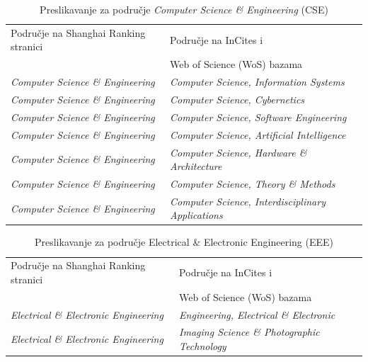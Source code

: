 \documentclass[times, utf8, zavrsni]{fer}
\begin{document}
\begin{table}[htb]
    \caption{Preslikavanje za područje \emph{Computer Science \& Engineering} (CSE)}
    \label{tbl:konstante}
    \centering
    \begin{tabular}{ll} \hline
    Područje na Shanghai Ranking stranici & Područje na InCites i \\ & Web of Science (WoS) bazama\\ \hline
    \emph{Computer Science \& Engineering} & \emph{Computer Science, Information Systems} \\
    \emph{Computer Science \& Engineering} & \emph{Computer Science, Cybernetics} \\
    \emph{Computer Science \& Engineering} & \emph{Computer Science, Software Engineering} \\
    \emph{Computer Science \& Engineering} & \emph{Computer Science, Artificial Intelligence} \\
    \emph{Computer Science \& Engineering} & \emph{Computer Science, Hardware \& Architecture} \\
    \emph{Computer Science \& Engineering} & \emph{Computer Science, Theory \& Methods} \\
    \emph{Computer Science \& Engineering} & \emph{Computer Science, Interdisciplinary Applications} \\
    \end{tabular}
    \end{table}
    \FloatBarrier
    \hfil

\begin{table}[htb]
    \caption{Preslikavanje za područje Electrical \& Electronic Engineering (EEE)}
        \label{tbl:konstante1}
        \centering
        \begin{tabular}{ll} \hline
        Područje na Shanghai Ranking stranici & Područje na InCites i \\ & Web of Science (WoS) bazama\\ \hline
        \emph{Electrical \& Electronic Engineering} &  \emph{Engineering, Electrical \& Electronic}\\
        \emph{Electrical \& Electronic Engineering} &  \emph{Imaging Science \& Photographic Technology}\\
        \end{tabular}
        \end{table}    
        \FloatBarrier
\end{document}
